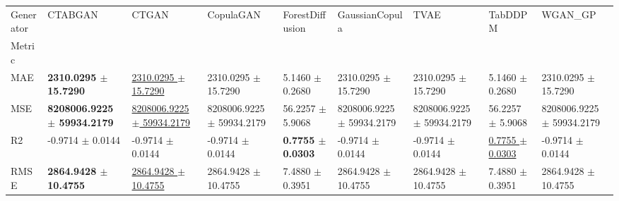 \begin{tabular}{lllllllll}
\toprule
Generator & CTABGAN & CTGAN & CopulaGAN & ForestDiffusion & GaussianCopula & TVAE & TabDDPM & WGAN_GP \\
Metric &  &  &  &  &  &  &  &  \\
\midrule
MAE & \textbf{2310.0295 $\pm$ 15.7290} & \underline{2310.0295 $\pm$ 15.7290} & 2310.0295 $\pm$ 15.7290 & 5.1460 $\pm$ 0.2680 & 2310.0295 $\pm$ 15.7290 & 2310.0295 $\pm$ 15.7290 & 5.1460 $\pm$ 0.2680 & 2310.0295 $\pm$ 15.7290 \\
MSE & \textbf{8208006.9225 $\pm$ 59934.2179} & \underline{8208006.9225 $\pm$ 59934.2179} & 8208006.9225 $\pm$ 59934.2179 & 56.2257 $\pm$ 5.9068 & 8208006.9225 $\pm$ 59934.2179 & 8208006.9225 $\pm$ 59934.2179 & 56.2257 $\pm$ 5.9068 & 8208006.9225 $\pm$ 59934.2179 \\
R2 & -0.9714 $\pm$ 0.0144 & -0.9714 $\pm$ 0.0144 & -0.9714 $\pm$ 0.0144 & \textbf{0.7755 $\pm$ 0.0303} & -0.9714 $\pm$ 0.0144 & -0.9714 $\pm$ 0.0144 & \underline{0.7755 $\pm$ 0.0303} & -0.9714 $\pm$ 0.0144 \\
RMSE & \textbf{2864.9428 $\pm$ 10.4755} & \underline{2864.9428 $\pm$ 10.4755} & 2864.9428 $\pm$ 10.4755 & 7.4880 $\pm$ 0.3951 & 2864.9428 $\pm$ 10.4755 & 2864.9428 $\pm$ 10.4755 & 7.4880 $\pm$ 0.3951 & 2864.9428 $\pm$ 10.4755 \\
\bottomrule
\end{tabular}

